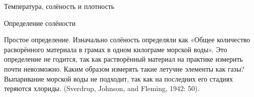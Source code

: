 \begin{chapter}{Температура, солёность и плотность}
\begin{section}{Определение солёности}
%

\begin{paragraph}{Простое определение.} 
Изначально солёность определяли как «Общее количество расворённого
материала в грамах в одном килограме морской воды». Это определение не
годится, так как растворённый материал на практике измерить почти
невозможно. Каким образом измерять такие летучие элементы как газы?
Выпаривание морской воды не подходит, так как на последних его стадиях
теряются хлориды. (Sverdrup, Johnson, and Fleming, 1942: 50).
%
\end{paragraph}


\end{section}
\end{chapter}
